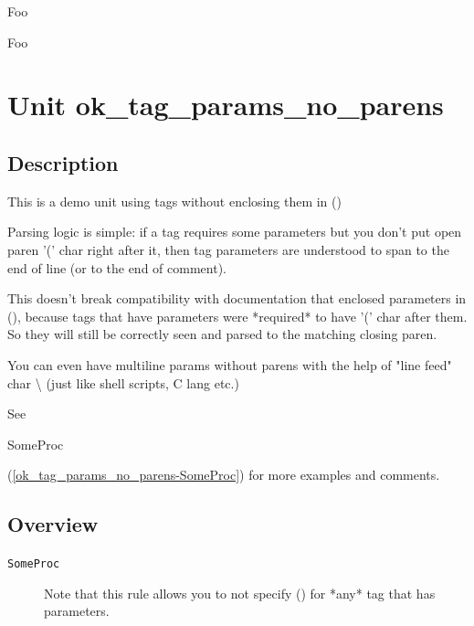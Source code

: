 \documentclass{report}
\begin{document}
\begin{ttfamily}Foo\end{ttfamily}

\begin{ttfamily}Foo\end{ttfamily}
\chapter{Unit ok{\_}tag{\_}params{\_}no{\_}parens}
\label{ok_tag_params_no_parens}
\section{Description}
This is a demo unit using tags without enclosing them in ()\hfill\vspace*{1ex}



Parsing logic is simple: if a tag requires some parameters but you don't put open paren '(' char right after it, then tag parameters are understood to span to the end of line (or to the end of comment).

This doesn't break compatibility with documentation that enclosed parameters in (), because tags that have parameters were *required* to have '(' char after them. So they will still be correctly seen and parsed to the matching closing paren.

You can even have multiline params without parens with the help of "line feed" char {\textbackslash} (just like shell scripts, C lang etc.)

See \begin{ttfamily}SomeProc\end{ttfamily}(\ref{ok_tag_params_no_parens-SomeProc}) for more examples and comments.

   
\section{Overview}
\begin{description}
\item[\texttt{\begin{ttfamily}EFoo\end{ttfamily} Class}]
\end{description}
\begin{description}
\item[\texttt{SomeProc}]Note that this rule allows you to not specify () for *any* tag that has parameters.
\end{description}
\end{document}
